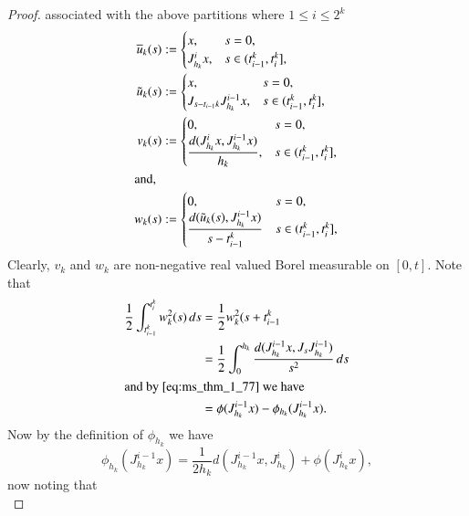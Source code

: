 \documentclass[a4paper,11pt, leqno]{scrreprt} %
\renewcommand{\leq}{\leqslant}
\renewcommand{\leq}{\leqslant}
\theoremstyle{change}
\theoremstyle{nonumberplain}
\newtheorem{proof}{Proof}
\begin{document}
\begin{proof}
  associated with the above partitions where $1 \leq i \leq 2^k$
  \begin{align}
    \label{eq:ms_thm_1_86}
    \overline{u}_k(s) &:= \begin{cases}
      x, &s = 0,\\
      J_{h_k}^i x, & s \in (t_{i -1}^k, t_i^k],
      \end{cases}\\
    \label{eq:ms_thm_1_87}
    \tilde{u}_k(s) &:= \begin{cases}
      x, & s = 0,\\
      J_{s-t_{i - 1}k} J_{h_k}^{i - 1} x, & s \in (t_{i -1}^k, t_i^k],
      \end{cases}\\
    \label{eq:ms_thm_1_88}
    v_k(s) &:= \begin{cases}
      0, & s = 0,\\
      \displaystyle \frac{d(J_{h_k}^i x, J_{h_k}^{i - 1} x)}{h_k}, & s \in (t_{i -1}^k, t_i^k],
      \end{cases}\\
    \shortintertext{and,}
    \label{eq:ms_thm_1_89}
    w_k(s) &:= \begin{cases}
      0, & s = 0,\\
     \displaystyle \frac{d(\tilde u_k(s), J_{h_k}^{i - 1} x)}{s - t_{i - 1}^k} & s \in (t_{i -1}^k, t_i^k],
      \end{cases}
  \end{align}
  Clearly, $v_k$ and $w_k$ are non-negative real valued Borel
  measurable on $[0, t]$. Note that
  \begin{equation}
    \label{eq:ms_thm_1_90}
    \begin{split}
      \frac12 \int_{t_{i - 1}^k}^{t_i^k} w_k^2(s) \, ds &= \frac12
      w_k^2(s + t_{i - 1}^k\\
      &=\frac12 \int_0^{h_k} \frac{d(J_{h_k}^{i - 1} x, J_s J_{h_k}^{i
          - 1})}{s^2} \, ds\\
      \shortintertext{and by \eqref{eq:ms_thm_1_77} we have}
      &=\phi(J_{h_k}^{i - 1} x) - \phi_{h_k}(J_{h_k}^{i - 1} x).
    \end{split}
  \end{equation}
  Now by the definition of $\phi_{h_k}$ we have
  \begin{equation}
    \label{eq:ms_thm_1_91}
    \phi_{h_k}(J_{h_k}^{i - 1} x) = \frac1{2h_k} d(J_{h_k}^{i - 1} x,
    J_{h_k}^i) + \phi(J_{h_k}^i x),
  \end{equation}
  now noting that 
  \begin{equation}

\end{equation}
\end{proof}
\end{document}
